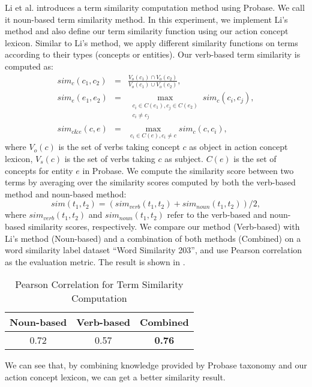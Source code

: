 Li et al.\cite{LiWZWW13} introduces a term similarity computation method
using Probase. We call it noun-based term similarity method.
In this experiment, we implement Li's method and also define our term similarity
function using our action concept lexicon.
Similar to Li's method, we apply different similarity
functions on terms according to their types (concepts or entities).
Our verb-based term similarity is computed as:
\begin{eqnarray*}
sim_{c}(c_1,c_2) &=& \frac{V_o(c_1)\cap V_o(c_2)}{V_o(c_1)\cup V_o(c_2)}, \\
sim_{e}(e_1,e_2) &=& \max_{\substack{c_i\in C(e_1),c_j\in C(e_2)\\c_i\neq c_j}}sim_{c}(c_i,c_j), \\
sim_{c\&e}(c,e) &=& \max_{c_i\in C(e),c_i\neq c}sim_c(c,c_i),
\end{eqnarray*}
where $V_o(c)$ is the set of verbs taking concept $c$ as object in action concept lexicon, $V_s(c)$
is the set of verbs taking $c$ as subject. $C(e)$ is the set of concepts for entity $e$ in
Probase.
We compute the similarity score between two terms by
averaging over the similarity scores computed by both
the verb-based method and noun-based method:
$$
sim(t_1,t_2)=(sim_{verb}(t_1,t_2)+sim_{noun}(t_1,t_2))/2,
$$
where $sim_{verb}(t_1,t_2)$ and $sim_{noun}(t_1,t_2)$ refer to the verb-based and noun-based similarity scores,
respectively.
We compare our method (Verb-based) with Li's method (Noun-based) and a combination of both
methods (Combined) on a word similarity label dataset
``Word Similarity 203''\cite{LiWZWW13}, and use Pearson correlation as the evaluation metric.
The result is shown in .
\begin{table}[th]
\small
\centering
\caption{Pearson Correlation for Term Similarity Computation}
\begin{tabular}{|c|c|c|}
\hline
Noun-based & Verb-based & Combined \\
\hline
\hline
0.72 & 0.57 & {\bf 0.76} \\
\hline
\end{tabular}
\label{tab:sim}
\end{table}

We can see that, by combining knowledge provided by Probase taxonomy and our action concept
lexicon, we can get a better similarity result.

